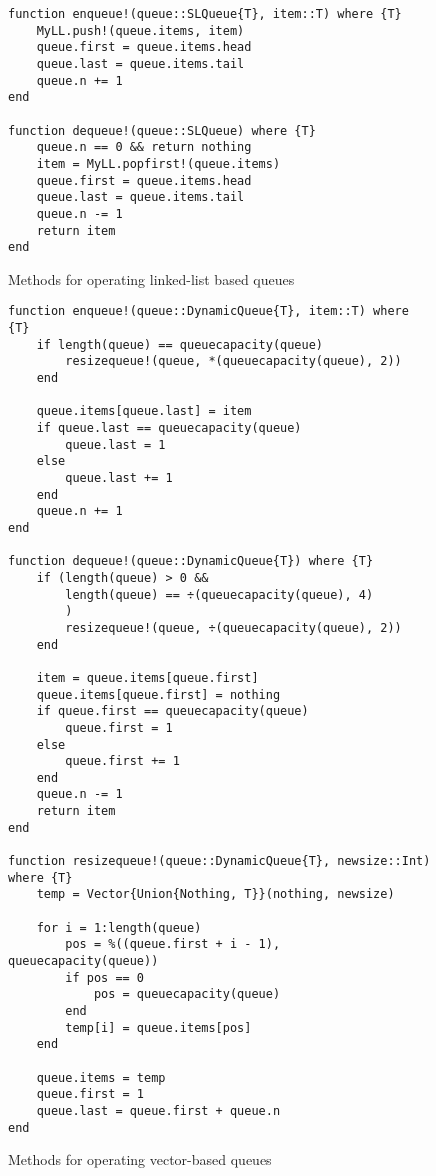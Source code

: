 \documentclass[a4paper, 11pt]{article}
\begin{document}
    \begin{figure}[H]
        \centering
    \begin{verbatim}
function enqueue!(queue::SLQueue{T}, item::T) where {T}
    MyLL.push!(queue.items, item)
    queue.first = queue.items.head
    queue.last = queue.items.tail
    queue.n += 1
end

function dequeue!(queue::SLQueue) where {T}
    queue.n == 0 && return nothing
    item = MyLL.popfirst!(queue.items)
    queue.first = queue.items.head
    queue.last = queue.items.tail
    queue.n -= 1
    return item
end
    \end{verbatim}
    \caption{Methods for operating linked-list based queues}
    \label{code:listoperations}
    \end{figure}

    \begin{figure}[H]
        \centering
    \begin{verbatim}
function enqueue!(queue::DynamicQueue{T}, item::T) where {T}
    if length(queue) == queuecapacity(queue) 
        resizequeue!(queue, *(queuecapacity(queue), 2))
    end

    queue.items[queue.last] = item
    if queue.last == queuecapacity(queue)
        queue.last = 1
    else
        queue.last += 1
    end
    queue.n += 1
end

function dequeue!(queue::DynamicQueue{T}) where {T}
    if (length(queue) > 0 && 
        length(queue) == ÷(queuecapacity(queue), 4)
        )
        resizequeue!(queue, ÷(queuecapacity(queue), 2))
    end

    item = queue.items[queue.first] 
    queue.items[queue.first] = nothing
    if queue.first == queuecapacity(queue)
        queue.first = 1
    else
        queue.first += 1
    end
    queue.n -= 1
    return item
end

function resizequeue!(queue::DynamicQueue{T}, newsize::Int) where {T}
	temp = Vector{Union{Nothing, T}}(nothing, newsize)

    for i = 1:length(queue)
        pos = %((queue.first + i - 1), queuecapacity(queue))
        if pos == 0 
            pos = queuecapacity(queue)
        end
        temp[i] = queue.items[pos]
    end

	queue.items = temp
    queue.first = 1
    queue.last = queue.first + queue.n
end
    \end{verbatim}
    \caption{Methods for operating vector-based queues}
    \label{code:vectoroperations}
    \end{figure}
\end{document}
